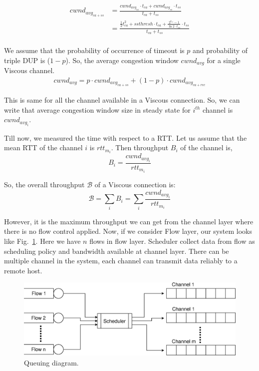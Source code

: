 \begin{equation}
\begin{split}
cwnd_{avg_{ca+ss}} &= \frac{cwnd_{avg_{ca}} \cdot t_{ca} + cwnd_{avg_{ss}} \cdot t_{ss}} {t_{ca} + t_{ss}} \\
&= \frac{\frac{1}{2} t_{ca}^2+ssthresh \cdot t_{ca} + \frac{2^{t_{ss}}-1}{\ln{2} \cdot t_{ss}} \cdot t_{ss}}{t_{ca} + t_{ss}} \\
\end{split}
\end{equation}


We assume that the probability of occurrence of timeout is $p$ and probability of triple DUP is ($1-p$). So, the average congestion window $cwnd_{avg}$ for a single Viscous channel.
\begin{equation}
\begin{split}
cwnd_{avg} = p \cdot cwnd_{avg_{ca+ss}} + (1-p) \cdot cwnd_{avg_{ca+rec}}
\end{split}
\end{equation}

This is same for all the channel available in a Viscous connection. So, we can write that average congestion window size in steady state for $i^{th}$ channel is $cwnd_{avg_i}$.

Till now, we measured the time with respect to a RTT. Let us assume that the mean RTT of the channel $i$ is $rtt_{m_i}$. Then throughput $B_i$ of the channel is, 
\begin{equation}
B_i = \frac{cwnd_{avg_i}}{rtt_{m_i}}
\end{equation}


So, the overall throughput $\mathcal{B}$ of a Viscous connection is:
$$ \mathcal{B} = \sum_{i}^{} B_i = \sum_{i}^{} \frac{cwnd_{avg_i}}{rtt_{m_i}} $$


However, it is the maximum throughput we can get from the channel layer where there is no flow control applied. Now, if we consider Flow layer, our system looks like Fig.~\ref{fig:sys_que}. Here we have $n$ flows in flow layer. Scheduler collect data from flow as scheduling policy and bandwidth available at channel layer. There can be multiple channel in the system, each channel can transmit data reliably to a remote host.

\begin{figure}[!h]
	\centering
	\includegraphics[width=\linewidth]{img/model/system_queue}
	\caption{Queuing diagram.}
	\label{fig:sys_que}
\end{figure}

